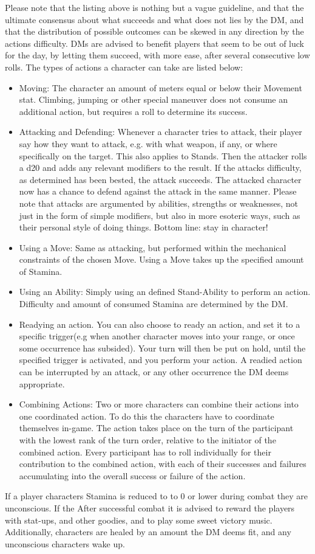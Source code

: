 \documentclass[a4paper,12pt]{article}
\begin{document}
Please note that the listing above is nothing but a vague guideline, and that the ultimate consensus about what succeeds and what does not lies by the DM, and that the distribution of possible outcomes can be skewed in any direction by the actions difficulty. DMs are advised to benefit players that seem to be out of luck for the day, by letting them succeed, with more ease, after several consecutive low rolls.
The types of actions a character can take are listed below:
\begin{itemize}
	\item Moving: The character an amount of meters equal or below their Movement stat. Climbing, jumping or other special maneuver does not consume an additional action, but requires a roll to determine its success.
	\item Attacking and Defending: Whenever a character tries to attack, their player say how they want to attack, e.g. with what weapon, if any, or where specifically on the target. This also applies to Stands. Then the attacker rolls a d20 and adds any relevant modifiers to the result. If the attacks difficulty, as determined has been bested, the attack succeeds. The attacked character now has a chance to defend against the attack in the same manner. Please note that attacks are argumented by abilities, strengths or weaknesses, not just in the form of simple modifiers, but also in more esoteric ways, such as their personal style of doing things. Bottom line: stay in character!
	\item Using a Move: Same as attacking, but performed within the mechanical constraints of the chosen Move. Using a Move takes up the specified amount of Stamina.
	\item Using an Ability: Simply using an defined Stand-Ability to perform an action. Difficulty and amount of consumed Stamina are determined by the DM.
	\item Readying an action. You can also choose to ready an action, and set it to a specific trigger(e.g when another character moves into your range, or once some occurrence has subsided). Your turn will then be put on hold, until the specified trigger is activated, and you perform your action. A readied action can be interrupted by an attack, or any other occurrence the DM deems appropriate.
	\item Combining Actions: Two or more characters can combine their actions into one coordinated action. To do this the characters have to coordinate themselves in-game. The action takes place on the turn of the participant with the lowest rank of the turn order, relative to the initiator of the combined action. Every participant has to roll individually for their contribution to the combined action, with each of their successes and failures accumulating into the overall success or failure of the action.
\end{itemize}
If a player characters Stamina is reduced to to 0 or lower during combat they are unconscious. If the
After successful combat it is advised to reward the players with stat-ups, and other goodies, and to play some sweet victory music. Additionally, characters are healed by an amount the DM deems fit, and any unconscious characters wake up. 
\end{document}
